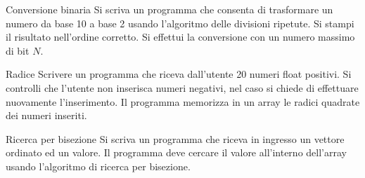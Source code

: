 \documentclass[9pt, format=169]{beamer}
\begin{document}
\begin{frame}{Conversione binaria}
Si scriva un programma che consenta di trasformare un numero da base 10 a base 2 usando l'algoritmo delle divisioni ripetute. Si stampi il risultato nell'ordine corretto. Si effettui la conversione con un numero massimo di bit $N$.
\end{frame}

\begin{frame}{Radice}
Scrivere un programma che riceva dall'utente 20 numeri float positivi.
Si controlli che l'utente non inserisca numeri negativi, nel caso si chiede di effettuare nuovamente l'inserimento.
Il programma memorizza in un array le radici quadrate dei numeri inseriti.
\end{frame}

\begin{frame}{Ricerca per bisezione}
Si scriva un programma che riceva in ingresso un vettore ordinato ed un valore.
Il programma deve cercare il valore all'interno dell'array usando l'algoritmo di ricerca per bisezione.
\end{frame}
\end{document}
